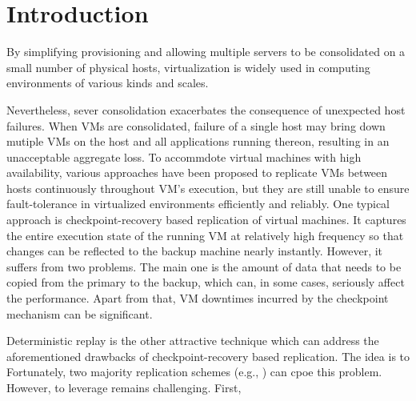 \section{Introduction} \label{sec:intro}

By simplifying provisioning and allowing multiple servers to be consolidated on a 
small number of physical hosts, virtualization is widely used in computing environments 
of various kinds and scales.

Nevertheless, sever consolidation exacerbates the consequence of unexpected host failures. 
When VMs are consolidated, failure of a single host may bring down mutiple VMs on the host 
and all applications running thereon, resulting in an unacceptable aggregate loss. 
To accommdote virtual machines with high availability, various approaches have been 
proposed to replicate VMs between hosts continuously throughout VM's execution, but 
they are still unable to ensure fault-tolerance in virtualized environments efficiently 
and reliably. One typical approach is checkpoint-recovery based replication of virtual 
machines. It captures the entire execution state of the running VM at relatively 
high frequency so that changes can be reflected to the backup machine nearly instantly. 
However, it suffers from two problems. The main one is the amount of data that needs to be 
copied from the primary to the backup, which can, in some cases, seriously affect the performance. 
Apart from that, VM downtimes incurred by the checkpoint mechanism can be significant.

Deterministic replay is the other attractive technique which can address the aforementioned 
drawbacks of checkpoint-recovery based replication. The idea is to 
Fortunately, two majority replication schemes (e.g., \paxos) can cpoe this problem. However, to 
leverage \paxos remains challenging. First, 


